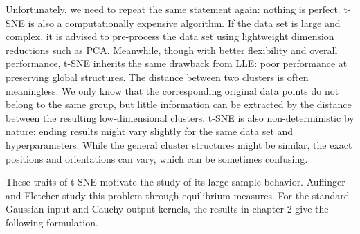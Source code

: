 Unfortunately, we need to repeat the same statement again: nothing is perfect. t-SNE is also a computationally expensive algorithm. If the data set is large and complex, it is advised to pre-process the data set using lightweight dimension reductions such as PCA. Meanwhile, though with better flexibility and overall performance, t-SNE inherits the same drawback from LLE: poor performance at preserving global structures. The distance between two clusters is often meaningless. We only know that the corresponding original data points do not belong to the same group, but little information can be extracted by the distance between the resulting low-dimensional clusters. t-SNE is also non-deterministic by nature: ending results might vary slightly for the same data set and hyperparameters. While the general cluster structures might be similar, the exact positions and orientations can vary, which can be sometimes confusing.

These traits of t-SNE motivate the study of its large-sample behavior.
Auffinger and Fletcher \cite{auffinger-tsne} study this problem
through equilibrium measures. For the standard Gaussian input and Cauchy
output kernels, the results in chapter 2 give the following formulation.

